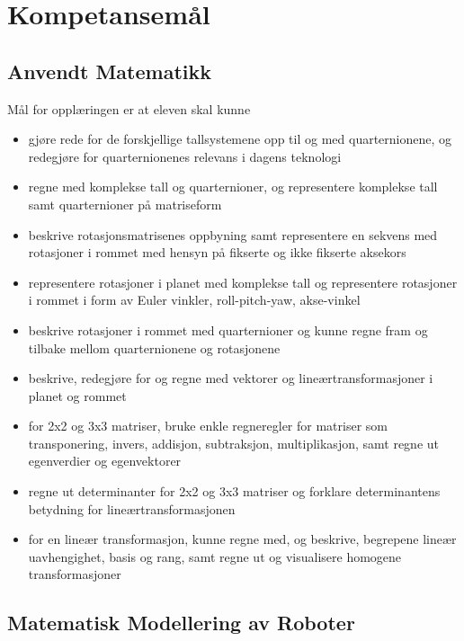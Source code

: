 \section*{Kompetansemål} \label{Sec: Kompetansemaal}

\subsection*{Anvendt Matematikk}

    Mål for opplæringen er at eleven skal kunne

    \begin{itemize}
        \item gjøre rede for de forskjellige tallsystemene opp til og med quarternionene, og redegjøre for quarternionenes relevans i dagens teknologi
        \item regne med komplekse tall og quarternioner, og representere komplekse tall samt quarternioner på matriseform
        \item beskrive rotasjonsmatrisenes oppbyning samt representere en sekvens med rotasjoner i rommet med hensyn på fikserte og ikke fikserte aksekors
        \item representere rotasjoner i planet med komplekse tall og representere rotasjoner i rommet i form av Euler vinkler, roll-pitch-yaw, akse-vinkel
        \item beskrive rotasjoner i rommet med quarternioner og kunne regne fram og tilbake mellom quarternionene og rotasjonene
        \item beskrive, redegjøre for og regne med vektorer og lineærtransformasjoner i planet og rommet
        \item for 2x2 og 3x3 matriser, bruke enkle regneregler for matriser som transponering, invers, addisjon, subtraksjon, multiplikasjon, samt regne ut egenverdier og egenvektorer
        \item regne ut determinanter for 2x2 og 3x3 matriser og forklare determinantens betydning for lineærtransformasjonen
        \item for en lineær transformasjon, kunne regne med, og beskrive, begrepene lineær uavhengighet, basis og rang, samt regne ut og visualisere homogene transformasjoner
    \end{itemize}


\subsection*{Matematisk Modellering av Roboter}

